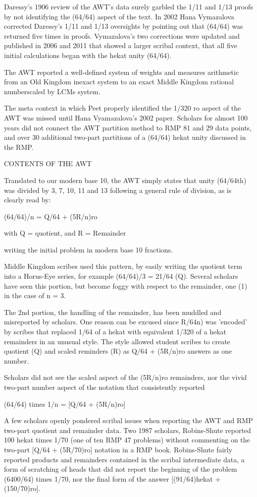 \documentclass[12pt]{article}
\begin{document}
Daressy's 1906 review of the AWT's data surely garbled the 1/11 and 1/13 proofs by not identifying the (64/64) aspect of the text. In 2002 Hana Vymazalova corrected Daressy's 1/11 and 1/13 oversights by pointing out that (64/64) was returned five times in proofs. Vymazalova's two corrections were updated and published in 2006 and 2011 that showed a larger scribal context,  that all five initial calculations began with the hekat unity (64/64).

The AWT reported a well-defined system of weights and measures arithmetic from an Old Kingdom inexact system to an exact Middle Kingdom rational numberscaled by LCMs system.

The meta context in which Peet properly identified the 1/320 ro aspect of the AWT was missed until Hana Vyamazalova's 2002 paper. Scholars for almost 100 years did not connect the AWT partition method to RMP 81 and 29 data points, and over 30 additional two-part partitions of a (64/64) hekat unity discussed in the RMP.


CONTENTS OF THE AWT

Translated to our modern base 10, the AWT simply states that unity (64/64th) was divided by 3, 7, 10, 11 and 13 following a general rule of division, as is clearly read by:

(64/64)/n = Q/64 + (5R/n)ro

with Q = quotient, and R = Remainder

writing the initial problem in modern base 10 fractions.

Middle Kingdom scribes used this pattern, by easily writing the quotient term into a Horus-Eye series, for example (64/64)/3 = 21/64 (Q). Several scholars have seen this portion, but become foggy with respect to the remainder, one (1) in the case of n = 3.

The 2nd portion, the handling of the remainder, has been muddled and misreported by scholars. One reason can be excused since R/64n) was 'encoded' by scribes that replaced 1/64 of a hekat with equivalent 1/320 of a hekat remainders in an unusual style. The style allowed student scribes to create quotient (Q) and  scaled reminders (R) as Q/64 + (5R/n)ro answers as one number.

Scholars did not see the scaled aspect of the (5R/n)ro remainders, nor the vivid two-part number aspect of the notation that consistently reported 

(64/64) times 1/n = [Q/64 + (5R/n)ro]

A few scholars openly pondered scribal issues when reporting the AWT and RMP two-part quotient and remainder data. Two 1987 scholars, Robins-Shute reported 100 hekat times 1/70 (one of ten RMP 47 problems) without commenting on the two-part [Q/64 + (5R/70)ro] notation in a  RMP book. Robins-Shute fairly reported products and remainders contained in the scribal intermediate data, a form of scratching of heads that did not report the beginning of the problem (6400/64) times 1/70, nor the final form of the answer [(91/64)hekat + (150/70)ro]. 
\end{document}
